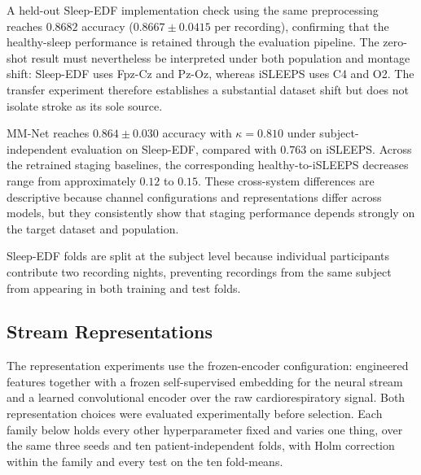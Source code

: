 \documentclass{ieeeaccess}
\newcommand{\mmAcc}{0.763}
\begin{document}
A held-out Sleep-EDF implementation check using the same preprocessing reaches
$0.8682$ accuracy ($0.8667 \pm 0.0415$ per recording), confirming that the
healthy-sleep performance is retained through the evaluation pipeline. The
zero-shot result must nevertheless be interpreted under both population and
montage shift: Sleep-EDF uses Fpz-Cz and Pz-Oz, whereas iSLEEPS uses C4 and O2.
The transfer experiment therefore establishes a substantial dataset shift but
does not isolate stroke as its sole source.

MM-Net reaches $0.864 \pm 0.030$ accuracy with $\kappa=0.810$ under
subject-independent evaluation on Sleep-EDF, compared with $\mmAcc$ on iSLEEPS. Across the retrained staging baselines, the corresponding
healthy-to-iSLEEPS decreases range from approximately $0.12$ to $0.15$.
These cross-system differences are descriptive because channel configurations
and representations differ across models, but they consistently show that
staging performance depends strongly on the target dataset and population.

Sleep-EDF folds are split at the subject level because individual participants
contribute two recording nights, preventing recordings from the same subject
from appearing in both training and test folds.



\subsection{Stream Representations}
\label{sec:repr}
The representation experiments use the frozen-encoder configuration: engineered features together with a frozen self-supervised embedding for the neural stream and a learned convolutional encoder over the raw cardiorespiratory signal. Both representation choices were evaluated experimentally before selection. Each family below holds every other hyperparameter fixed and varies one thing, over
the same three seeds and ten patient-independent folds, with Holm correction within the
family and every test on the ten fold-means.
\end{document}
